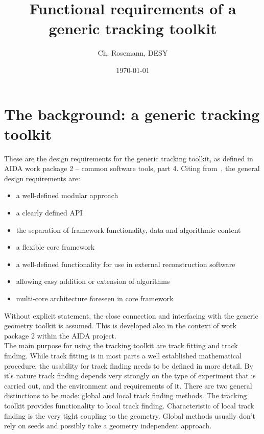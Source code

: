 \documentclass[12pt]{article}
\title{Functional requirements of a generic tracking toolkit}
\author{Ch. Rosemann, DESY}
\date{\today}
\begin{document}
\maketitle 
{}

\section{The background: a generic tracking toolkit}
These are the design requirements for the generic tracking toolkit, as defined in AIDA work package 2 -- common software tools, part 4.
Citing from~\cite{aida2.4}, the general design requirements are:
\begin{itemize}
    \item a well-defined modular approach
    \item a clearly defined API
    \item the separation of framework functionality, data and algorithmic content
    \item a flexible core framework
    \item a well-defined functionality for use in external reconstruction software
    \item allowing easy addition or extension of algorithms
    \item multi-core architecture foreseen in core framework
\end{itemize}
Without explicit statement, the close connection and interfacing with the generic geometry toolkit is assumed.
This is developed also in the context of work package 2 within the AIDA project.\\

The main purpose for using the tracking toolkit are track fitting and track finding.
While track fitting is in most parts a well established mathematical procedure, the usability for track finding needs to be defined in more detail.
By it's nature track finding depends very strongly on the type of experiment that is carried out, and the environment and requirements of it.
There are two general distinctions to be made: global and local track finding methods.
The tracking toolkit provides functionality to local track finding.
Characteristic of local track finding is the very tight coupling to the geometry.
Global methods usually don't rely on seeds and possibly take a geometry independent approach.
\end{document}
